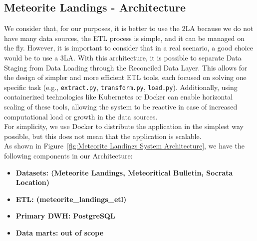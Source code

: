 \documentclass[conference]{IEEEtran}
\begin{document}
	\subsection{Meteorite Landings - Architecture}
	We consider that, for our purposes, it is better to use the 2LA because we do not have many data sources, the ETL process is simple, and it can be managed on the fly. However, it is important to consider that in a real scenario, a good choice would be to use a 3LA. With this architecture, it is possible to separate Data Staging from Data Loading through the Reconciled Data Layer. This allows for the design of simpler and more efficient ETL tools, each focused on solving one specific task (e.g., \texttt{extract.py}, \texttt{transform.py}, \texttt{load.py}). Additionally, using containerized technologies like Kubernetes or Docker can enable horizontal scaling of these tools, allowing the system to be reactive in case of increased computational load or growth in the data sources.\\ For simplicity, we use Docker to distribute the application in the simplest way possible, but this does not mean that the application is scalable.\\
	As shown in Figure~\ref{fig:Meteorite Landings System Architecture}, we have the following components in our Architecture:
	\begin{itemize}
		\item \textbf{Datasets: (Meteorite Landings, Meteoritical Bulletin, Socrata Location)}
		\item \textbf{ETL: (meteorite\_landings\_etl)}
		\item \textbf{Primary DWH: PostgreSQL}
		\item \textbf{Data marts: out of scope}  
	\end{itemize}
\end{document}
